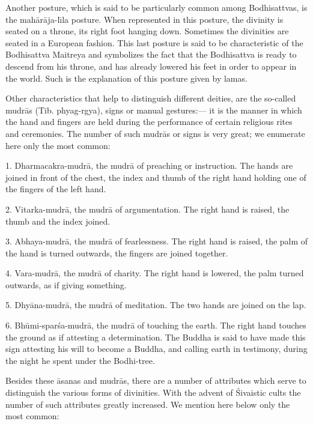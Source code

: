 \documentclass[a4paper, 12pt, oneside]{article}
\begin{document}
Another posture, which is said to be particularly common among Bodhisattvas, is the mah\={a}r\={a}ja-l\={\i}la posture. When represented in this posture, the divinity is seated on a throne, its right foot hanging down. Sometimes the divinities are seated in a European fashion. This last posture is said to be characteristic of the Bodhisattva Maitreya and symbolizes the fact that the Bodhisattva is ready to descend from his throne, and has already lowered his feet in order to appear in the world. Such is the explanation of this posture given by lamas.

Other characteristics that help to distinguish different deities, are the so-called mudr\={a}s (Tib. phyag-rgya), signs or manual gestures:--- it is the manner in which the hand and fingers are held during the performance of certain religious rites and ceremonies. The number of such mudr\={a}s or signs is very great; we enumerate here only the most common:

1. Dharmacakra-mudr\={a}, the mudr\={a} of preaching or instruction. The hands are joined in front of the chest, the index and thumb of the right hand holding one of the fingers of the left hand.

2. Vitarka-mudr\={a}, the mudr\={a} of argumentation. The right hand is raised, the thumb and the index joined.

3. Abhaya-mudr\={a}, the mudr\={a} of fearlessness. The right hand is raised, the palm of the hand is turned outwards, the fingers are joined together.

4. Vara-mudr\={a}, the mudr\={a} of charity. The right hand is lowered, the palm turned outwards, as if giving something.

5. Dhy\={a}na-mudr\={a}, the mudr\={a} of meditation. The two hands are joined on the lap.

6. Bh\={u}mi-spar\'{s}a-mudr\={a}, the mudr\={a} of touching the earth. The right hand touches the ground as if attesting a determination. The Buddha is said to have made this sign attesting his will to become a Buddha, and calling earth in testimony, during the night he spent under the Bodhi-tree.

Besides these \={a}sanas and mudr\={a}s, there are a number of attributes which serve to distinguish the various forms of divinities. With the advent of \'{S}ivaistic cults the number of such attributes greatly increased. We mention here below only the most common:
\end{document}
